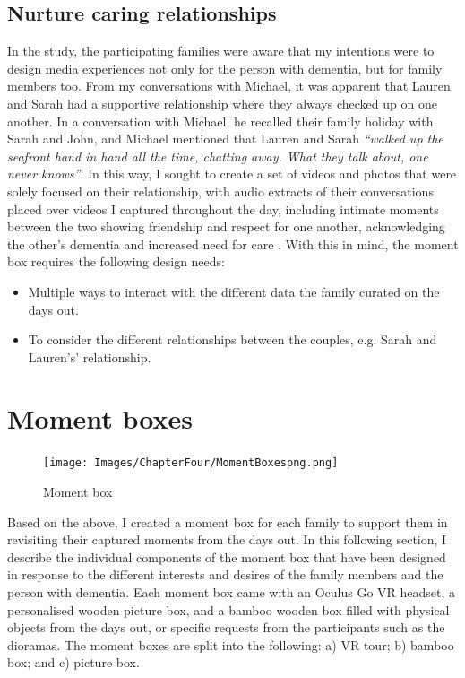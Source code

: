 \subsection{Nurture caring relationships}
\label{CaringRelationships}
In the study, the participating families were aware that my intentions were to design media experiences not only for the person with dementia, but for family members too. From my conversations with Michael, it was apparent that Lauren and Sarah had a supportive relationship where they always checked up on one another. In a conversation with Michael, he recalled their family holiday with Sarah and John, and Michael mentioned that Lauren and Sarah \textit{``walked up the seafront hand in hand all the time, chatting away. What they talk about, one never knows''}. In this way, I sought to create a set of videos and photos that were solely focused on their relationship, with audio extracts of their conversations placed over videos I captured throughout the day, including intimate moments between the two showing friendship and respect for one another, acknowledging the other's dementia and increased need for care . With this in mind, the moment box requires the following design needs:

\begin{itemize}
    \item Multiple ways to interact with the different data the family curated on the days out.
    \item To consider the different relationships between the couples, e.g. Sarah and Lauren's' relationship.
\end{itemize}


\section{Moment boxes}
\label{MomentBoxes}

\begin{figure}[htp]
\centering
\texttt{[image: Images/ChapterFour/MomentBoxespng.png]}
\caption{Moment box}
\label{fig:MomentBoxes}
\end{figure}

Based on the above, I created a moment box for each family to support them in revisiting their captured moments from the days out. In this following section, I describe the individual components of the moment box that have been designed in response to the different interests and desires of the family members and the person with dementia. Each moment box came with an Oculus Go VR headset, a personalised wooden picture box, and a bamboo wooden box filled with physical objects from the days out, or specific requests from the participants such as the dioramas. The moment boxes are split into the following: a) VR tour; b) bamboo box; and c) picture box.

